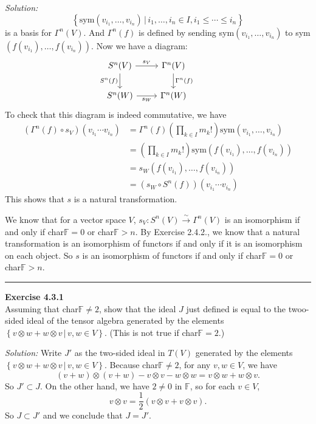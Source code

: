 \documentclass[a4paper, 12pt]{article}
\newenvironment{problem}[2][Exercise]
    { \begin{mdframed}[backgroundcolor=gray!20] \textbf{#1 #2} \\}
    {  \end{mdframed}}
\newenvironment{solution}
    {\textit{Solution:}}
    {}
\begin{document}
\begin{solution}
\[\left\{ \text{sym}(v_{i_1},\ldots,v_{i_n})\,|\, i_1,\ldots,i_n\in I,i_1\leq \cdots\leq i_n \right\}\]
is a basis for \(\Gamma^n(V)\). And \(\Gamma^n(f)\) is defined by sending sym\((v_{i_1},\ldots,v_{i_n})\) to sym\((f(v_{i_1}),\ldots,f(v_{i_n}))\). Now we have a diagram:
\[\begin{tikzcd}
	{S^n(V)} & {\Gamma^n(V)} & {} \\
	{S^n(W)} & {\Gamma^n(W)}
	\arrow["{s_V}", from=1-1, to=1-2]
	\arrow["{S^n(f)}"', from=1-1, to=2-1]
	\arrow["{\Gamma^n(f)}", from=1-2, to=2-2]
	\arrow["{s_W}"', from=2-1, to=2-2]
\end{tikzcd}\]
To check that this diagram is indeed commutative, we have 
\begin{align*}
	(\Gamma^n(f)\circ s_V)(v_{i_1}\cdots v_{i_n}) & =\Gamma^n(f)(\prod_{k\in I}m_k!)\text{sym}(v_{i_1},\ldots,v_{i_n})\\ 
	                                             & =(\prod_{k\in I}m_k!)\text{sym}(f(v_{i_1}),\ldots,f(v_{i_n}))\\ 
												 & =s_W(f(v_{i_1}),\ldots,f(v_{i_n}))\\ 
												 & =(s_W\circ S^n(f))(v_{i_1}\cdots v_{i_n})
\end{align*}
This shows that \(s\) is a natural transformation.
\par 
We know that for a vector space \(V\), \(s_V:S^n(V)\xrightarrow{\sim} \Gamma^n(V)\) is an isomorphism if and only if char\(\mathbb{F}=0\) or char\(\mathbb{F}>n\). By Exercise 2.4.2., we know that a natural transformation is an isomorphism of functors if and only if it is an isomorphism on each object. 
So \(s\) is an isomorphism of functors if and only if char\(\mathbb{F}=0\) or char\(\mathbb{F}>n\). 
\end{solution}

\noindent\rule{7in}{2.8pt}
\begin{problem}{4.3.1}
Assuming that char\(\mathbb{F}\neq 2\), show that the ideal \(J\) just defined is equal to the twoo-sided ideal of the tensor algebra generated by the elements \(\left\{ v\otimes w+w\otimes v\,|\, v,w\in V \right\}\). 
(This is not true if char\(\mathbb{F}=2\).)
\end{problem}
\begin{solution}
Write \(J'\) as the two-sided ideal in \(T(V)\) generated by the elements \(\left\{ v\otimes w+w\otimes v\,|\, v,w\in V \right\}\). Because char\(\mathbb{F}\neq 2\), for any \(v,w\in V\), we have 
\[(v+w)\otimes (v+w)-v\otimes v-w\otimes w=v\otimes w+w\otimes v.\]
So \(J'\subset J\). On the other hand, we have \(2\neq 0\) in \(\mathbb{F}\), so for each \(v\in V\), 
\[v\otimes v=\frac{1}{2}(v\otimes v+v\otimes v).\]
So \(J\subset J'\) and we conclude that \(J=J'\).
\end{solution}
\end{document}
